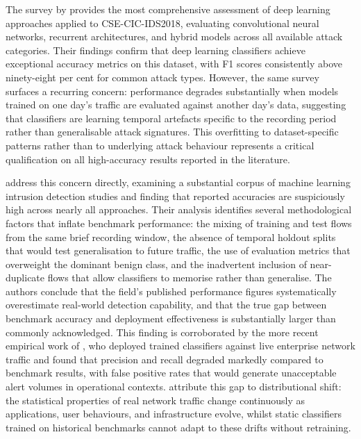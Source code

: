 The survey by \textcite{Ferrag2020} provides the most comprehensive assessment of deep learning approaches applied to CSE-CIC-IDS2018, evaluating convolutional neural networks, recurrent architectures, and hybrid models across all available attack categories. Their findings confirm that deep learning classifiers achieve exceptional accuracy metrics on this dataset, with F1 scores consistently above ninety-eight per cent for common attack types. However, the same survey surfaces a recurring concern: performance degrades substantially when models trained on one day's traffic are evaluated against another day's data, suggesting that classifiers are learning temporal artefacts specific to the recording period rather than generalisable attack signatures. This overfitting to dataset-specific patterns rather than to underlying attack behaviour represents a critical qualification on all high-accuracy results reported in the literature.

\textcite{Leevy2020} address this concern directly, examining a substantial corpus of machine learning intrusion detection studies and finding that reported accuracies are suspiciously high across nearly all approaches. Their analysis identifies several methodological factors that inflate benchmark performance: the mixing of training and test flows from the same brief recording window, the absence of temporal holdout splits that would test generalisation to future traffic, the use of evaluation metrics that overweight the dominant benign class, and the inadvertent inclusion of near-duplicate flows that allow classifiers to memorise rather than generalise. The authors conclude that the field's published performance figures systematically overestimate real-world detection capability, and that the true gap between benchmark accuracy and deployment effectiveness is substantially larger than commonly acknowledged. This finding is corroborated by the more recent empirical work of \textcite{Hesford2024}, who deployed trained classifiers against live enterprise network traffic and found that precision and recall degraded markedly compared to benchmark results, with false positive rates that would generate unacceptable alert volumes in operational contexts. \textcite{Hesford2024} attribute this gap to distributional shift: the statistical properties of real network traffic change continuously as applications, user behaviours, and infrastructure evolve, whilst static classifiers trained on historical benchmarks cannot adapt to these drifts without retraining.

